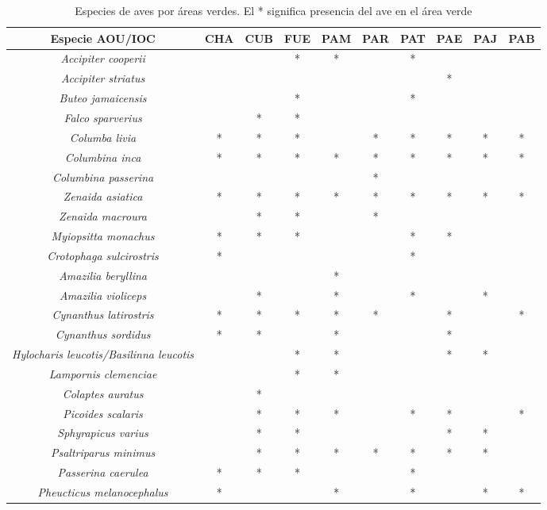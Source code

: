 \documentclass[letterpaper,12pt]{article}
\begin{document}
{\scriptsize
\begin{longtable}[c] {|c|c|c|c|c|c|c|c|c|c|} 
\caption[Especies de aves por áreas verdes]{Especies de aves por áreas verdes. El * significa presencia del ave en el área verde} \\ \toprule
Especie AOU/IOC & CHA & CUB & FUE & PAM & PAR & PAT & PAE & PAJ & PAB \\ \midrule
\textit{Accipiter cooperii} & & & * & * & & * & & &  \\
\textit{Accipiter striatus} &   &  &  &  & & & * & &\\
\textit{Buteo jamaicensis} &  &  & * & & & *& & &\\
\textit{Falco sparverius} &  &  * & * & & & & & & \\
\textit{Columba livia} & * & * & * & & * & * & * & * & *  \\
\textit{Columbina inca} & * & * & * & * & * & * & * & * & * \\
\textit{Columbina passerina} &  & &  &  & * & & & & \\
\textit{Zenaida asiatica}& * & * & * & * & * & * & * & * & * \\
\textit{Zenaida macroura} &  & * & * & & * & & & & \\
\textit{Myiopsitta monachus} & * & * & * & & & * & * & & \\ 
\textit{Crotophaga sulcirostris} & * &  &  & & & * & & & \\ 
\textit{Amazilia beryllina} &  &  &  & * & & & & & \\ 
\textit{Amazilia violiceps} &  & * & & * & &*& & * &  \\
\textit{Cynanthus latirostris} & *  & * & * & * & * & & * & &*\\
\textit{Cynanthus sordidus} & * & * &  & * & & & *& & \\
\textit{Hylocharis leucotis/Basilinna leucotis} &  &   & * & * & &  & * &* &  \\
\textit{Lampornis clemenciae} &  &  & * & * & & & & &\\ 
\textit{Colaptes auratus} &  & * &  & & & & & & \\
\textit{Picoides scalaris} &  & * & * & * & & * & * & &* \\
\textit{Sphyrapicus varius} &  & * & * & & & & * & * & \\ 
\textit{Psaltriparus minimus} &  & * & * & * & * & * & * & * & \\
\textit{Passerina caerulea} & * & * & * & & & * & & & \\
\textit{Pheucticus melanocephalus} & * &  &  & * & & * & &* & * \\

\end{longtable}}
\end{document}
